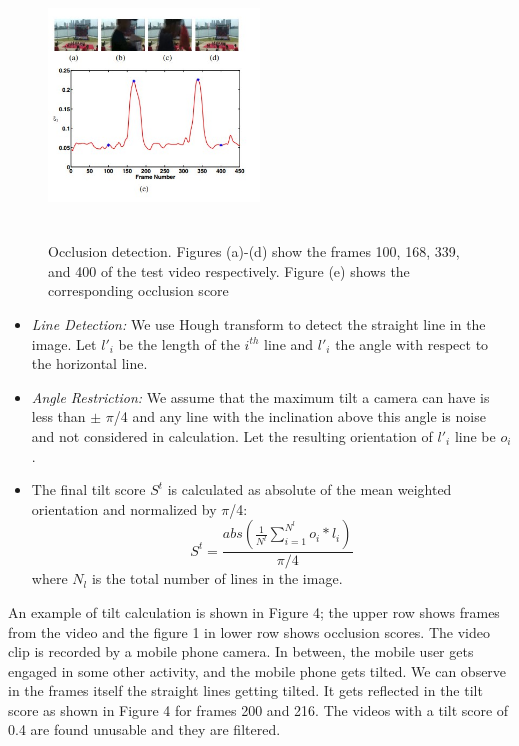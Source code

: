 \documentclass{sig-alternate}
\begin{document}
 \begin{figure}[h]
\includegraphics[width=0.5\textwidth ,height = 7cm]{image3}
\caption{ Occlusion detection. Figures (a)-(d) show the frames 100, 168, 339, and 400 of the test video respectively. Figure (e) shows the corresponding occlusion score
}
\label{fig:figure3}
\end{figure}
\begin{itemize}
\item  \textit{Line Detection:} We use Hough transform to detect the straight line in the image. Let \(l'_i\) be the length of the \(i^{th}\) line and \(l'_i\) the angle with respect to the horizontal line.
\item \textit{Angle Restriction:} We assume that the maximum tilt a camera can have is less than $\pm$ $\pi$/4 and any line with the inclination above this angle is noise and not considered in calculation. Let the resulting orientation of \(l'_i\) line be \(o_i\). 
\item The final tilt score \(S^t\) is calculated as absolute of the mean weighted orientation and normalized by $\pi$/4:
\begin{equation}
S^t = \frac{abs( \frac{1}{N^l}\sum_{i=1}^{N^l}o_i*l_i )}{\pi/4} 
\end{equation}
where \(N_l\) is the total number of lines in the image.
\end{itemize}

An example of tilt calculation is shown in Figure 4; the upper row shows frames from the video and the figure 1 in lower row shows occlusion scores. The video clip is recorded by a mobile phone camera. In between, the mobile user gets engaged in some other activity, and the mobile phone gets tilted. We can observe in the frames itself the straight lines getting tilted. It gets reflected in the tilt score as shown in Figure 4 for frames 200 and 216. The videos with a tilt score of 0.4 are found unusable and they are filtered. 
\end{document}
